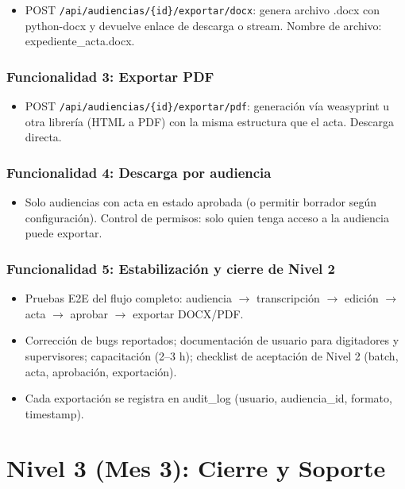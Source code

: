 \documentclass[12pt,a4paper]{report}
\begin{document}
\begin{itemize}
    \item POST \texttt{/api/audiencias/\{id\}/exportar/docx}: genera archivo .docx con python-docx y devuelve enlace de descarga o stream. Nombre de archivo: expediente\_acta.docx.
\end{itemize}

\subsubsection{Funcionalidad 3: Exportar PDF}

\begin{itemize}
    \item POST \texttt{/api/audiencias/\{id\}/exportar/pdf}: generación vía weasyprint u otra librería (HTML a PDF) con la misma estructura que el acta. Descarga directa.
\end{itemize}

\subsubsection{Funcionalidad 4: Descarga por audiencia}

\begin{itemize}
    \item Solo audiencias con acta en estado aprobada (o permitir borrador según configuración). Control de permisos: solo quien tenga acceso a la audiencia puede exportar.
\end{itemize}

\subsubsection{Funcionalidad 5: Estabilización y cierre de Nivel 2}

\begin{itemize}
    \item Pruebas E2E del flujo completo: audiencia $\to$ transcripción $\to$ edición $\to$ acta $\to$ aprobar $\to$ exportar DOCX/PDF.
    \item Corrección de bugs reportados; documentación de usuario para digitadores y supervisores; capacitación (2--3 h); checklist de aceptación de Nivel 2 (batch, acta, aprobación, exportación).
    \item Cada exportación se registra en audit\_log (usuario, audiencia\_id, formato, timestamp).
\end{itemize}

\section{Nivel 3 (Mes 3): Cierre y Soporte}
\end{document}
